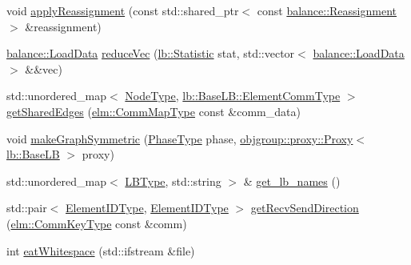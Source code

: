 \begin{DoxyCompactItemize}
\item 
void \hyperlink{namespacevt_1_1vrt_1_1collection_1_1balance_a36a9f7b402e41e88d3840df04e39eb6c}{apply\+Reassignment} (const std\+::shared\+\_\+ptr$<$ const \hyperlink{structvt_1_1vrt_1_1collection_1_1balance_1_1_reassignment}{balance\+::\+Reassignment} $>$ \&reassignment)
\item 
\hyperlink{structvt_1_1vrt_1_1collection_1_1balance_1_1_load_data}{balance\+::\+Load\+Data} \hyperlink{namespacevt_1_1vrt_1_1collection_1_1balance_a4b385056c706c7325c54963e7d9a1b32}{reduce\+Vec} (\hyperlink{namespacevt_1_1vrt_1_1collection_1_1lb_af0e20ef9afee77295053aa83bf1348b1}{lb\+::\+Statistic} stat, std\+::vector$<$ \hyperlink{structvt_1_1vrt_1_1collection_1_1balance_1_1_load_data}{balance\+::\+Load\+Data} $>$ \&\&vec)
\item 
std\+::unordered\+\_\+map$<$ \hyperlink{namespacevt_a866da9d0efc19c0a1ce79e9e492f47e2}{Node\+Type}, \hyperlink{structvt_1_1vrt_1_1collection_1_1lb_1_1_base_l_b_a83eb4daec14edfb8780422e95b8e38d3}{lb\+::\+Base\+L\+B\+::\+Element\+Comm\+Type} $>$ \hyperlink{namespacevt_1_1vrt_1_1collection_1_1balance_ac3a36cc89a7a64a5a0dc703562b5151f}{get\+Shared\+Edges} (\hyperlink{namespacevt_1_1elm_a38487cb8896b9b4763efa9022fab560e}{elm\+::\+Comm\+Map\+Type} const \&comm\+\_\+data)
\item 
void \hyperlink{namespacevt_1_1vrt_1_1collection_1_1balance_adb94fe32f6565b52ab18e5e0131c48b0}{make\+Graph\+Symmetric} (\hyperlink{namespacevt_a46ce6733d5cdbd735d561b7b4029f6d7}{Phase\+Type} phase, \hyperlink{structvt_1_1objgroup_1_1proxy_1_1_proxy}{objgroup\+::proxy\+::\+Proxy}$<$ \hyperlink{structvt_1_1vrt_1_1collection_1_1lb_1_1_base_l_b}{lb\+::\+Base\+LB} $>$ proxy)
\item 
std\+::unordered\+\_\+map$<$ \hyperlink{namespacevt_1_1vrt_1_1collection_1_1balance_ac4f99693509affcc67db182d4aad9b5c}{L\+B\+Type}, std\+::string $>$ \& \hyperlink{namespacevt_1_1vrt_1_1collection_1_1balance_ab24424d5cc677e1c6dfe67d5e03efc70}{get\+\_\+lb\+\_\+names} ()
\item 
std\+::pair$<$ \hyperlink{namespacevt_1_1vrt_1_1collection_1_1balance_a592736f733df4f90856df90a1fd08905}{Element\+I\+D\+Type}, \hyperlink{namespacevt_1_1vrt_1_1collection_1_1balance_a592736f733df4f90856df90a1fd08905}{Element\+I\+D\+Type} $>$ \hyperlink{namespacevt_1_1vrt_1_1collection_1_1balance_a00d08e980a291c93c4c8b34101e7cd3f}{get\+Recv\+Send\+Direction} (\hyperlink{namespacevt_1_1elm_a89067ebf8407548591583dd2f60b53b5}{elm\+::\+Comm\+Key\+Type} const \&comm)
\item 
int \hyperlink{namespacevt_1_1vrt_1_1collection_1_1balance_a605ea184edf7f99b0022f960f71bf4d4}{eat\+Whitespace} (std\+::ifstream \&file)
\end{DoxyCompactItemize}
